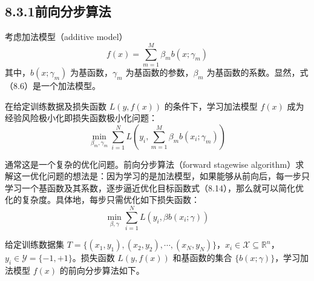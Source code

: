\documentclass[UTF8,12pt,a4paper,fontset=fandol]{ctexart}
\begin{document}
\subsection*{8.3.1\quad 前向分步算法}

考虑加法模型（additive model）
\begin{equation}
f(x)=\sum_{m=1}^M\beta_m b(x;\gamma_m)
\tag{8.13}
\end{equation}
其中，$b(x;\gamma_m)$ 为基函数，$\gamma_m$ 为基函数的参数，$\beta_m$ 为基函数的系数。显然，式（8.6）是一个加法模型。

在给定训练数据及损失函数 $L(y,f(x))$ 的条件下，学习加法模型 $f(x)$ 成为经验风险极小化即损失函数极小化问题：
\begin{equation}
\min_{\beta_m,\gamma_m}\sum_{i=1}^N
L\left(y_i,\sum_{m=1}^M\beta_m b(x_i;\gamma_m)\right)
\tag{8.14}
\end{equation}

通常这是一个复杂的优化问题。前向分步算法（forward stagewise algorithm）求解这一优化问题的想法是：因为学习的是加法模型，如果能够从前向后，每一步只学习一个基函数及其系数，逐步逼近优化目标函数式（8.14），那么就可以简化优化的复杂度。具体地，每步只需优化如下损失函数：
\begin{equation}
\min_{\beta,\gamma}\sum_{i=1}^N L(y_i,\beta b(x_i;\gamma))
\tag{8.15}
\end{equation}

给定训练数据集 $T=\{(x_1,y_1),(x_2,y_2),\cdots,(x_N,y_N)\}$，$x_i\in\mathcal{X}\subseteq\mathbb{R}^n$，$y_i\in\mathcal{Y}=\{-1,+1\}$。损失函数 $L(y,f(x))$ 和基函数的集合 $\{b(x;\gamma)\}$，学习加法模型 $f(x)$ 的前向分步算法如下。

\begin{center}
\end{center}
\end{document}
